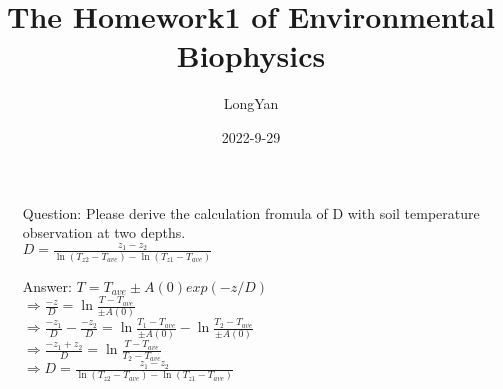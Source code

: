 \documentclass[12pt]{article}
\title{The Homework1 of Environmental Biophysics}
\author{LongYan}
\date{2022-9-29}
\begin{document}
\maketitle
\begin{enumerate}
    \Large
    \item[Question:] Please derive the calculation fromula of D with soil temperature observation at two depths.\\
    $D=\frac{z_{1}-z_{2}}{\ln{(T_{z2}-T_{ave})}-\ln{(T_{z1}-T_{ave})}}$
    \item[Answer:] $T = T_{ave} \pm A(0)exp(-z/D)$\\
    $\Rightarrow \frac{-z}{D} = \ln\frac{T-T_{ave}}{\pm A(0)}$\\ 
    $\Rightarrow \frac{-z_{1}}{D} - \frac{-z_{2}}{D} = \ln\frac{T_{1}-T_{ave}}{\pm A(0)} - \ln\frac{T_{2}-T_{ave}}{\pm A(0)}$\\
    $\Rightarrow \frac{-z_{1}+z_{2}}{D} = \ln\frac{T-T_{ave}}{T_{2}-T_{ave}}$\\
    $\Rightarrow D=\frac{z_{1}-z_{2}}{\ln{(T_{z2}-T_{ave})}-\ln{(T_{z1}-T_{ave})}}$
\end{enumerate}
\end{document}
